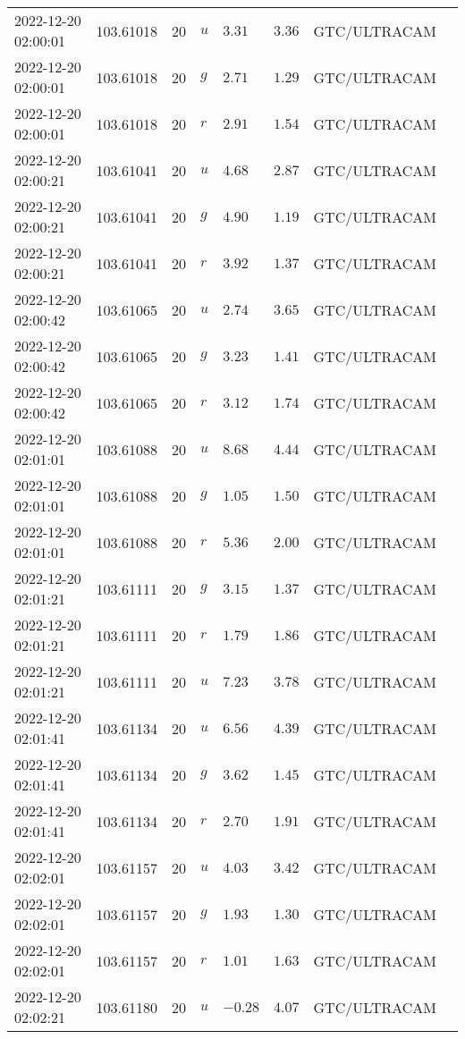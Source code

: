 \documentclass{nature_plusfigure}
\begin{document}
\begin{supplement}
\begin{center}
\begin{longtable}{llllllll}
2022-12-20 02:00:01 & 103.61018 & 20 & $u$ & $3.31$ & $3.36$ & GTC/ULTRACAM &  \\ 
2022-12-20 02:00:01 & 103.61018 & 20 & $g$ & $2.71$ & $1.29$ & GTC/ULTRACAM &  \\ 
2022-12-20 02:00:01 & 103.61018 & 20 & $r$ & $2.91$ & $1.54$ & GTC/ULTRACAM &  \\ 
2022-12-20 02:00:21 & 103.61041 & 20 & $u$ & $4.68$ & $2.87$ & GTC/ULTRACAM &  \\ 
2022-12-20 02:00:21 & 103.61041 & 20 & $g$ & $4.90$ & $1.19$ & GTC/ULTRACAM &  \\ 
2022-12-20 02:00:21 & 103.61041 & 20 & $r$ & $3.92$ & $1.37$ & GTC/ULTRACAM &  \\ 
2022-12-20 02:00:42 & 103.61065 & 20 & $u$ & $2.74$ & $3.65$ & GTC/ULTRACAM &  \\ 
2022-12-20 02:00:42 & 103.61065 & 20 & $g$ & $3.23$ & $1.41$ & GTC/ULTRACAM &  \\ 
2022-12-20 02:00:42 & 103.61065 & 20 & $r$ & $3.12$ & $1.74$ & GTC/ULTRACAM &  \\ 
2022-12-20 02:01:01 & 103.61088 & 20 & $u$ & $8.68$ & $4.44$ & GTC/ULTRACAM &  \\ 
2022-12-20 02:01:01 & 103.61088 & 20 & $g$ & $1.05$ & $1.50$ & GTC/ULTRACAM &  \\ 
2022-12-20 02:01:01 & 103.61088 & 20 & $r$ & $5.36$ & $2.00$ & GTC/ULTRACAM &  \\ 
2022-12-20 02:01:21 & 103.61111 & 20 & $g$ & $3.15$ & $1.37$ & GTC/ULTRACAM &  \\ 
2022-12-20 02:01:21 & 103.61111 & 20 & $r$ & $1.79$ & $1.86$ & GTC/ULTRACAM &  \\ 
2022-12-20 02:01:21 & 103.61111 & 20 & $u$ & $7.23$ & $3.78$ & GTC/ULTRACAM &  \\ 
2022-12-20 02:01:41 & 103.61134 & 20 & $u$ & $6.56$ & $4.39$ & GTC/ULTRACAM &  \\ 
2022-12-20 02:01:41 & 103.61134 & 20 & $g$ & $3.62$ & $1.45$ & GTC/ULTRACAM &  \\ 
2022-12-20 02:01:41 & 103.61134 & 20 & $r$ & $2.70$ & $1.91$ & GTC/ULTRACAM &  \\ 
2022-12-20 02:02:01 & 103.61157 & 20 & $u$ & $4.03$ & $3.42$ & GTC/ULTRACAM &  \\ 
2022-12-20 02:02:01 & 103.61157 & 20 & $g$ & $1.93$ & $1.30$ & GTC/ULTRACAM &  \\ 
2022-12-20 02:02:01 & 103.61157 & 20 & $r$ & $1.01$ & $1.63$ & GTC/ULTRACAM &  \\ 
2022-12-20 02:02:21 & 103.61180 & 20 & $u$ & $-0.28$ & $4.07$ & GTC/ULTRACAM &  \\ 

\end{longtable}
\end{center}
\end{supplement}
\end{document}
